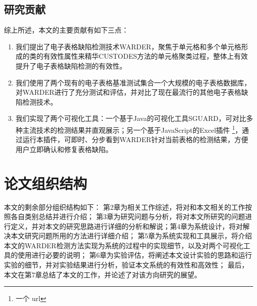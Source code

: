 \subsection{研究贡献}

综上所述，本文的主要贡献有如下三点：

\begin{enumerate}
    \item 我们提出了电子表格缺陷检测技术WARDER，聚焦于单元格和多个单元格形成的类的有效性属性来精华CUSTODES方法的单元格聚类过程，整体上有效提升了电子表格缺陷检测的有效性。
    \item 我们使用了两个现有的电子表格基准测试集合一个大规模的电子表格数据库，对WARDER进行了充分测试和评估，并对比了现在最流行的其他电子表格缺陷检测技术。
    \item 我们实现了两个可视化工具：一个基于Java的可视化工具SGUARD\cite{li2019sguard}，可对比多种主流技术的检测结果并直观展示；另一个基于JavaScript的Excel插件 \footnote{一个 url}，通过运行本插件，可即时、分步看到WARDER针对当前表格的检测结果，方便用户立即确认和修复表格缺陷。
\end{enumerate}

\section{论文组织结构}

本文的剩余部分组织结构如下：
第2章为相关工作综述，将对和本文相关的工作按照各自类别总结并进行介绍；
第3章为研究问题与分析，将对本文所研究的问题进行定义，并对本文的研究思路进行详细的分析和解说；第4章为系统设计，将对解决本文研究问题所用的方法进行详细介绍；
第5章为系统实现和工具展示，将介绍本文的WARDER检测方法实现为系统的过程中的实现细节，以及对两个可视化工具的使用进行必要的说明；
第6章为实验评估，将阐述本文设计实验的思路和运行实验的细节，并对实验结果进行分析，验证本文系统的有效性和高效性；
最后，本文在第7章总结了本文的工作，并论述了对该方向研究的展望。